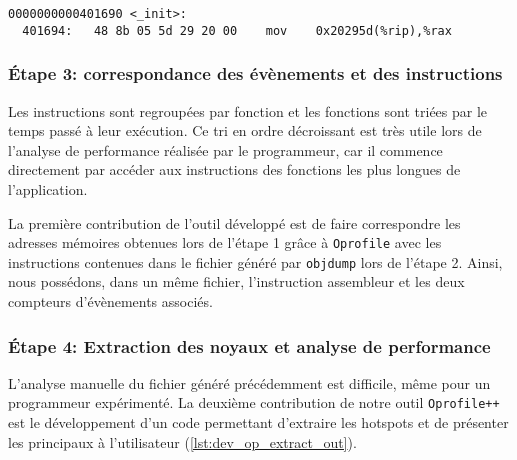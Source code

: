 \begin{lstlisting}[label=lst:dev_op_obj_out, caption={L'outil \texttt{objdump} permet de désassembler le fichier binaire de l'application.}]
0000000000401690 <_init>:
  401694:	48 8b 05 5d 29 20 00 	mov    0x20295d(%rip),%rax
\end{lstlisting}  

    \subsubsection{Étape 3: correspondance des évènements et des instructions}
    
    
        Les instructions sont regroupées par fonction et les fonctions sont triées par le temps passé à leur exécution. Ce tri en ordre décroissant est très utile lors de l'analyse de performance réalisée par le programmeur, car il commence directement par accéder aux instructions des fonctions les plus longues de l'application. 

        La première contribution de l'outil développé est de faire correspondre les adresses mémoires obtenues lors de l'étape 1 grâce à \verb=Oprofile=  avec les instructions contenues dans le fichier généré par \verb=objdump= lors de l'étape 2. Ainsi, nous possédons, dans un même fichier, l'instruction assembleur et les deux compteurs d'évènements associés. 
        

    \subsubsection{Étape 4: Extraction des noyaux et analyse de performance}
    
        L'analyse manuelle du fichier généré précédemment est difficile, même pour un programmeur expérimenté. La deuxième contribution de notre outil \verb=Oprofile++= est le développement d'un code permettant d'extraire les \glspl{hotspot} et de présenter les principaux à l'utilisateur (\autoref{lst:dev_op_extract_out}).
      
